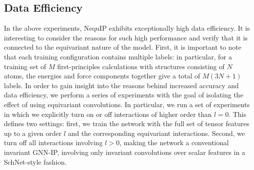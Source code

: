 \documentclass[%
reprint,
superscriptaddress,
nofootinbib,
amsmath,amssymb,
aps,
prl,
]{revtex4-1}
\begin{document}
\subsection{Data Efficiency}

In the above experiments, NequIP exhibits exceptionally high data efficiency. It is interesting to consider the reasons for such high performance and verify that it is connected to the equivariant nature of the model. First, it is important to note that each training configuration contains multiple labels: in particular, for a training set of $M$ first-principles calculations with structures consisting of $N$ atoms, the energies and force components together give a total of  $M (3N + 1)$ labels. In order to gain insight into the reasons behind increased accuracy and data efficiency, we perform a series of experiments with the goal of isolating the effect of using equivariant convolutions. In particular, we run a set of experiments in which we explicitly turn on or off interactions of higher order than $l=0$. This defines two settings: first, we train the network with the full set of tensor features up to a given order $l$ and the corresponding equivariant interactions. Second, we turn off all interactions involving $l>0$, making the network a conventional invariant GNN-IP, involving only invariant convolutions over scalar features in a SchNet-style fashion.\\
\end{document}
